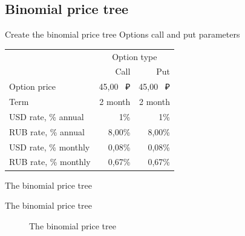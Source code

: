 \documentclass[_international_finance_p1.tex]{subfiles}
\begin{document}
\subsection{Binomial price tree}
\begin{frame}{Create the binomial price tree}
{Options call and put parameters}
\begin{center}
\begin{table}[htbp]
  \centering
    \begin{tabular}{lrr}
    \toprule
    & \multicolumn{2}{c}{Option type} \\  \cmidrule{2-3}
    & Call & Put \\
    \midrule
    Option price & 45,00 ~₽ & 45,00 ~₽ \\
    Term & 2 month & 2 month \\
    USD rate, \% annual & 1\% & 1\% \\
    RUB rate, \% annual & 8,00\% & 8,00\% \\
    USD rate, \% monthly & 0,08\% & 0,08\% \\
    RUB rate, \% monthly & 0,67\% & 0,67\% \\
    \bottomrule
    \end{tabular}%
  \label{tab:addlabel}%
\end{table}%
\end{center}
\end{frame}


\begin{frame}[fragile,shrink=35]{The binomial price tree}
\begin{center}

\end{center}
\end{frame}
\newcommand{\optionpicturescale}{1.2}
\begin{frame}[fragile,shrink=35]{The binomial price tree}
\begin{figure}
	\center
	\begin{overprint}
	\end{overprint}
	\caption{The binomial price tree}
\end{figure}

\end{frame}
\end{document}
